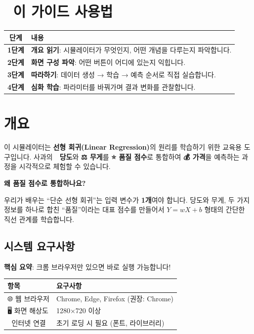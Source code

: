 \documentclass[11pt,a4paper]{article}
\begin{document}
\section*{📖 이 가이드 사용법}

\begin{center}
\begin{tabular}{|c|p{10cm}|}
\hline
\rowcolor{bgblue}
\textbf{단계} & \textbf{내용} \\
\hline
\textbf{1단계} & \textbf{개요 읽기}: 시뮬레이터가 무엇인지, 어떤 개념을 다루는지 파악합니다. \\
\hline
\textbf{2단계} & \textbf{화면 구성 파악}: 어떤 버튼이 어디에 있는지 익힙니다. \\
\hline
\textbf{3단계} & \textbf{따라하기}: 데이터 생성 → 학습 → 예측 순서로 직접 실습합니다. \\
\hline
\textbf{4단계} & \textbf{심화 학습}: 파라미터를 바꿔가며 결과 변화를 관찰합니다. \\
\hline
\end{tabular}
\end{center}

\tableofcontents
\newpage

\section{개요}

이 시뮬레이터는 \textbf{선형 회귀(Linear Regression)}의 원리를 학습하기 위한 교육용 도구입니다. 
사과의 \textbf{🍯 당도}와 \textbf{⚖️ 무게}를 \textbf{⭐ 품질 점수}로 통합하여 \textbf{💰 가격}을 예측하는 과정을 시각적으로 체험할 수 있습니다.

\begin{tipbox}
\textbf{왜 품질 점수로 통합하나요?}

우리가 배우는 ``단순 선형 회귀''는 입력 변수가 \textbf{1개}여야 합니다. 
당도와 무게, 두 가지 정보를 하나로 합친 ``품질''이라는 대표 점수를 만들어서 
$Y = wX + b$ 형태의 간단한 직선 관계를 학습합니다.
\end{tipbox}

\subsection{시스템 요구사항}

\textbf{핵심 요약}: 크롬 브라우저만 있으면 바로 실행 가능합니다! 🎉

\begin{center}
\begin{tabular}{ll}
\toprule
\textbf{항목} & \textbf{요구사항} \\
\midrule
🌐 웹 브라우저 & Chrome, Edge, Firefox (권장: Chrome) \\
🖥️ 화면 해상도 & 1280×720 이상 \\
📶 인터넷 연결 & 초기 로딩 시 필요 (폰트, 라이브러리) \\
\bottomrule
\end{tabular}
\end{center}
\end{document}
